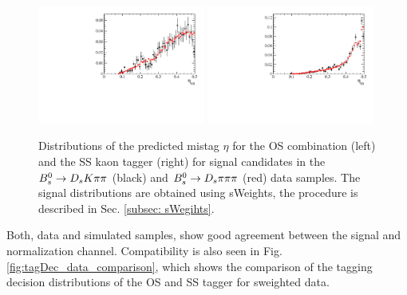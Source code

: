 \begin{figure}[h]
\includegraphics[height=7.cm,width=0.49\textwidth]{figs/Tagging/w_OS.pdf}
\includegraphics[height=7.cm,width=0.49\textwidth]{figs/Tagging/w_SS.pdf}
\caption{Distributions of the predicted mistag $\eta$ for the OS combination (left) and the SS kaon tagger (right) 
for signal candidates in the ${{B}^0_{s}}\rightarrow{\ensuremath{{D}_{s}}}{\ensuremath{K}}{\ensuremath{\pi}}{\ensuremath{\pi}}$ (black) and ${{B}^0_{s}}\rightarrow{\ensuremath{{D}_{s}}}{\ensuremath{\pi}}{\ensuremath{\pi}}{\ensuremath{\pi}}$ (red) data samples. 
The signal distributions are obtained using sWeights, the procedure is described in Sec. \ref{subsec: sWegihts}.}
\label{fig:w_data_comparison}
\end{figure}


Both, data and simulated samples, show good agreement between the signal and normalization channel. 
Compatibility is also seen in Fig. \ref{fig:tagDec_data_comparison}, which shows the comparison of the tagging decision distributions of the OS and SS tagger for sweighted data. 


